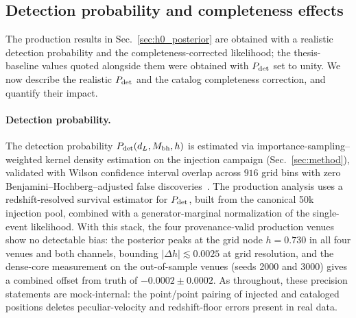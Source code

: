 \subsection{Detection probability and completeness effects}
\label{sec:pdet_completeness}

The production results in Sec.~\ref{sec:h0_posterior} are obtained
with a realistic detection probability and the completeness-corrected
likelihood; the thesis-baseline values quoted alongside them were
obtained with $P_\mathrm{det}$ set to unity. We now describe the realistic
$P_\mathrm{det}$ and the catalog completeness correction, and quantify their
impact.

\paragraph{Detection probability.}
The detection probability $P_\mathrm{det}(d_L, M_\mathrm{bh}, h)$ is estimated via
importance-sampling--weighted kernel density estimation on the injection
campaign (Sec.~\ref{sec:method}), validated with Wilson confidence
interval overlap across $916$ grid bins with zero
Benjamini--Hochberg--adjusted false
discoveries~\cite{Farr:2019rap,Tiwari:2017ndi}.
The production analysis uses a redshift-resolved survival estimator
for $P_\mathrm{det}$, built from the canonical 50k injection pool, combined
with a generator-marginal normalization of the single-event
likelihood. With this stack, the four provenance-valid production
venues show no detectable bias: the posterior peaks at the grid node
$h = 0.730$ in all four venues and both channels, bounding
$|\Delta h| \lesssim 0.0025$ at grid resolution, and the dense-core
measurement on the out-of-sample venues (seeds 2000 and 3000) gives a
combined offset from truth of $-0.0002 \pm 0.0002$. As throughout,
these precision statements are mock-internal: the point/point pairing
of injected and cataloged positions deletes peculiar-velocity and
redshift-floor errors present in real data.


